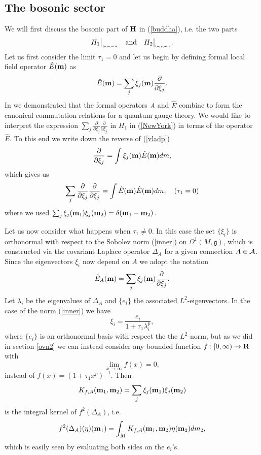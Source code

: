 \documentclass[letterpaper,11pt]{article}
\def\OO{\Omega}
\def\ca{{\cal A}}
\newcommand{\R}{\operatorname{\bold R}}
\begin{document}
\subsection{The bosonic sector}

We will first discuss the bosonic part of ${\bf H}$ in (\ref{buddha}), i.e. the two parts
$$
H_1 \big\vert_{\mbox{\tiny bosonic}} \quad \mbox{and}\quad H_2 \big\vert_{\mbox{\tiny bosonic}}.
$$
Let us first consider the limit $\tau_1=0$ and let us begin by defining formal local field operator $\hat{E}({\bf m})$ as
\begin{equation}
    \hat{E} ({\bf m}) =\sum_j  \xi_j ({\bf m}) \frac{\partial }{\partial \xi_j} .
     \label{vladp}
\end{equation}
In \cite{Aastrup:2019yui} we demonstrated that the formal operators ${A}$ and $\hat{E}$ combine to form the canonical commutation relations for a quantum gauge theory. 
We would like to interpret the expression $\sum_j \frac{\partial}{\partial \xi_j} \frac{\partial}{\partial \xi_j}$ in $H_1$ in (\ref{NewYork}) in terms of the operator $\hat{E}$. To this end we write down the reverse of (\ref{vladp}) 
$$
\frac{\partial}{\partial \xi_j} = \int \xi_j({\bf m})\hat{E}({\bf m}) dm , 
$$
which gives us
\begin{equation} 
\sum_j \frac{\partial}{\partial \xi_j} \frac{\partial}{\partial \xi_j} = \int \hat{E}({\bf m}) \hat{E}({\bf m}) dm , \quad (\tau_1=0)
\label{philipglass}
\end{equation}
where we used $\sum_j \xi_j({\bf m}_1)\xi_j({\bf m}_2)=\delta ({\bf m}_1-{\bf m}_2)$. 






Let us now consider what happens when $\tau_1\not=0$. In this case the set $\{ \xi_i\}$ is orthonormal with respect to the Sobolev norm (\ref{inner}) on $\OO^1(M,\mathfrak{g})$, which is constructed via the covariant Laplace operator $\Delta_A$ for a given connection $A\in\ca$. 
Since the eigenvectors $\xi_i$ now depend on $A$ we adopt the notation
\begin{equation}
\hat{E}_A({\bf m})=\sum_j \xi_j({\bf m}) \frac{\partial }{\partial \xi_j} .
\label{skrig}
\end{equation}
Let $\lambda_i$ be the eigenvalues of $\Delta_A$ and $\{e_i\}$ the associated $L^2$-eigenvectors. In the case of the norm (\ref{inner}) we have 
$$
\xi_i=\frac{e_i}{1+\tau_1\lambda_i^p},
$$
where $\{e_i\}$ is an orthonormal basis with respect the the $L^2$-norm, 
but as we did in section \ref{ovn2} we can instead consider any bounded function $f:[0, \infty) \to \R$ with 
$$
\lim_{x\to \infty} f(x)=0,
$$ 
instead of $f(x)=(1+\tau_1x^p)^{-1}$. Then
\begin{equation}
 K_{f,A}({\bf m}_1,{\bf m}_2)= \sum_j \xi_j({\bf m}_1)\xi_j({\bf m}_2)
\label{Kairo}
\end{equation}
is the integral kernel of $f^2(\Delta_A)$, i.e. 
$$f^2(\Delta_A)(\eta)({\bf m}_1)=\int_M K_{f,A} ({\bf m}_1,{\bf m}_2)\eta({\bf m}_2) dm_2 ,$$
which is easily seen by evaluating both sides on the $e_i$'s. 
\end{document}
